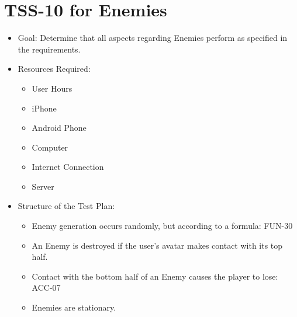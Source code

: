 \section{TSS-10 for Enemies}
\begin{itemize}
\item Goal: Determine that all aspects regarding Enemies perform as specified in the requirements.
\item Resources Required: 

\begin{itemize}
\item User Hours 
\item iPhone 
\item Android Phone 
\item Computer 
\item Internet Connection 
\item Server
\end{itemize}
\item Structure of the Test Plan: 

\begin{itemize}

\item Enemy generation occurs randomly, but according to a formula: FUN-30 
\item An Enemy is destroyed if the user's avatar makes contact with its top half.
\item Contact with the bottom half of an Enemy causes the player to lose: ACC-07
\item Enemies are stationary.

\end{itemize}
\end{itemize}

